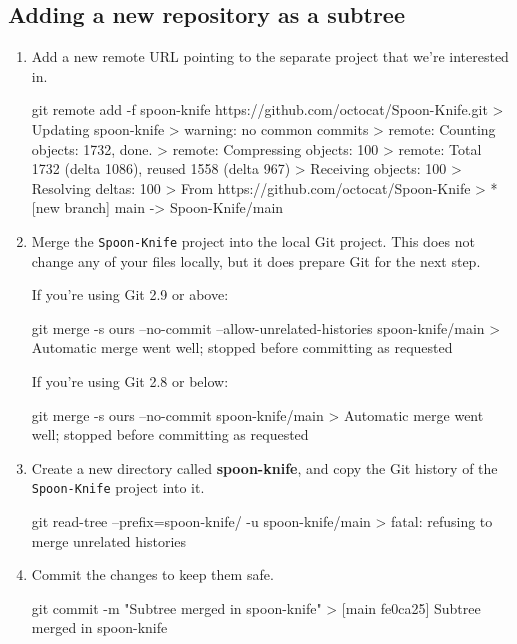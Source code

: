  \subsection{Adding a new repository as a subtree}
 \begin{enumerate}
    \item Add a new remote URL pointing to the separate project that we're interested in.
    \begin{codeblock}[language=bash]
git remote add -f spoon-knife https://github.com/octocat/Spoon-Knife.git
> Updating spoon-knife
> warning: no common commits
> remote: Counting objects: 1732, done.
> remote: Compressing objects: 100%
> remote: Total 1732 (delta 1086), reused 1558 (delta 967)
> Receiving objects: 100%
> Resolving deltas: 100%
> From https://github.com/octocat/Spoon-Knife
>  * [new branch]      main     -> Spoon-Knife/main
    \end{codeblock}
    \item Merge the \texttt{Spoon-Knife} project into the local Git project. This does not change any of your files locally, but it does prepare Git for the next step.
    
    If you're using Git 2.9 or above:
    \begin{codeblock}[language=bash]
git merge -s ours --no-commit --allow-unrelated-histories spoon-knife/main 
> Automatic merge went well; stopped before committing as requested
    \end{codeblock}

    If you're using Git 2.8 or below:
    \begin{codeblock}[language=bash]
git merge -s ours --no-commit spoon-knife/main
> Automatic merge went well; stopped before committing as requested
    \end{codeblock}

    \item Create a new directory called \textbf{spoon-knife}, and copy the Git history of the \texttt{Spoon-Knife} project into it.
    \begin{codeblock}[language=bash]
git read-tree --prefix=spoon-knife/ -u spoon-knife/main
> fatal: refusing to merge unrelated histories
    \end{codeblock}
    
    \item Commit the changes to keep them safe.
    \begin{codeblock}[language=bash]
git commit -m "Subtree merged in spoon-knife"
> [main fe0ca25] Subtree merged in spoon-knife
    \end{codeblock}
\end{enumerate}

